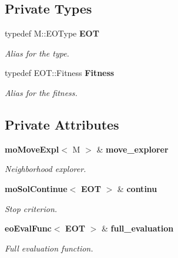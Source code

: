 \subsection*{Private Types}
\begin{CompactItemize}
\item 
typedef M::EOType {\bf EOT}\label{classmo_t_s_y0}

\begin{CompactList}\small\item\em Alias for the type. \item\end{CompactList}\item 
typedef EOT::Fitness {\bf Fitness}\label{classmo_t_s_y1}

\begin{CompactList}\small\item\em Alias for the fitness. \item\end{CompactList}\end{CompactItemize}
\subsection*{Private Attributes}
\begin{CompactItemize}
\item 
{\bf mo\-Move\-Expl}$<$ M $>$ \& {\bf move\_\-explorer}\label{classmo_t_s_r0}

\begin{CompactList}\small\item\em Neighborhood explorer. \item\end{CompactList}\item 
{\bf mo\-Sol\-Continue}$<$ {\bf EOT} $>$ \& {\bf continu}\label{classmo_t_s_r1}

\begin{CompactList}\small\item\em Stop criterion. \item\end{CompactList}\item 
{\bf eo\-Eval\-Func}$<$ {\bf EOT} $>$ \& {\bf full\_\-evaluation}\label{classmo_t_s_r2}

\begin{CompactList}\small\item\em Full evaluation function. \item\end{CompactList}\end{CompactItemize}


